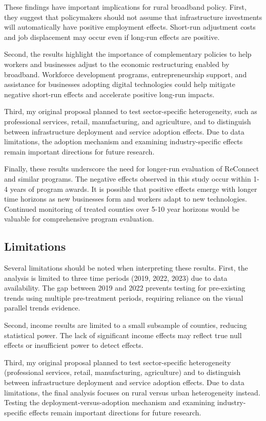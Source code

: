 \documentclass[12pt]{article}
\begin{document}
These findings have important implications for rural broadband policy. First, they suggest that policymakers should not assume that infrastructure investments will automatically have positive employment effects. Short-run adjustment costs and job displacement may occur even if long-run effects are positive.

Second, the results highlight the importance of complementary policies to help workers and businesses adjust to the economic restructuring enabled by broadband. Workforce development programs, entrepreneurship support, and assistance for businesses adopting digital technologies could help mitigate negative short-run effects and accelerate positive long-run impacts.

Third, my original proposal planned to test sector-specific heterogeneity, such as professional services, retail, manufacturing, and agriculture, and to distinguish between infrastructure deployment and service adoption effects. Due to data limitations, the adoption mechanism and examining industry-specific effects remain important directions for future research.

Finally, these results underscore the need for longer-run evaluation of ReConnect and similar programs. The negative effects observed in this study occur within 1-4 years of program awards. It is possible that positive effects emerge with longer time horizons as new businesses form and workers adapt to new technologies. Continued monitoring of treated counties over 5-10 year horizons would be valuable for comprehensive program evaluation.

\subsection{Limitations}

Several limitations should be noted when interpreting these results. First, the analysis is limited to three time periods (2019, 2022, 2023) due to data availability. The gap between 2019 and 2022 prevents testing for pre-existing trends using multiple pre-treatment periods, requiring reliance on the visual parallel trends evidence.

Second, income results are limited to a small subsample of counties, reducing statistical power. The lack of significant income effects may reflect true null effects or insufficient power to detect effects.

Third, my original proposal planned to test sector-specific heterogeneity (professional services, retail, manufacturing, agriculture) and to distinguish between infrastructure deployment and service adoption effects. Due to data limitations, the final analysis focuses on rural versus urban heterogeneity instead. Testing the deployment-versus-adoption mechanism and examining industry-specific effects remain important directions for future research.
\end{document}
